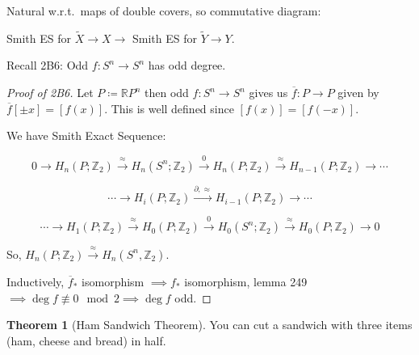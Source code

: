 \documentclass{article}
\theoremstyle{definition}
\newtheorem{theorem}{Theorem}
\begin{document}
    Natural w.r.t.\ maps of double covers, so commutative diagram:

    \begin{center}
    \end{center}

    Smith ES for \(\widetilde{X} \to X \to\) Smith ES for \(\widetilde{Y} \to Y\).

    Recall 2B6: Odd \(f: S^n \to S^n\) has odd degree.

    \begin{proof}
        [Proof of 2B6]

        Let \(P \coloneqq \mathbb{R}P^n\) then odd \(f: S^n \to S^n\) gives us \(\overline{f}: P \to P\) given by \(\overline{f}[\pm x] = [f(x)]\). This is well defined since \([f(x)]=[f(-x)]\).
        
        We have Smith Exact Sequence:

        \[
            0 \to H_n (P;\mathbb{Z}_2) \xrightarrow{\approx} H_n(S^n;\mathbb{Z}_2) \xrightarrow{0} H_n(P;\mathbb{Z}_2) \xrightarrow{\approx} H_{n-1} (P;\mathbb{Z}_2) \to \cdots 
        \]

        \[
            \cdots \to H_i(P;\mathbb{Z}_2) \xrightarrow{\partial, \approx} H_{i-1} (P;\mathbb{Z}_2) \to \cdots 
        \]

        \[
            \cdots \to H_1(P;\mathbb{Z}_2) \xrightarrow{\approx} H_0(P;\mathbb{Z}_2) \xrightarrow{0} H_0(S^n;\mathbb{Z}_2) \xrightarrow{\approx} H_0(P;\mathbb{Z}_2) \to 0
        \]

        So, \(H_n(P;\mathbb{Z}_2) \xrightarrow{\approx} H_n(S^n,\mathbb{Z}_2)\).
        
        Inductively, \(\overline{f}_{\ast}\) isomorphism \(\implies f_{\ast}\) isomorphism, lemma 249 \(\implies \deg f \not\equiv 0 \mod 2 \implies \deg f\) odd.

    \end{proof}

    \begin{theorem}
        [Ham Sandwich Theorem] You can cut a sandwich with three items (ham, cheese and bread) in half.
    \end{theorem}
\end{document}

